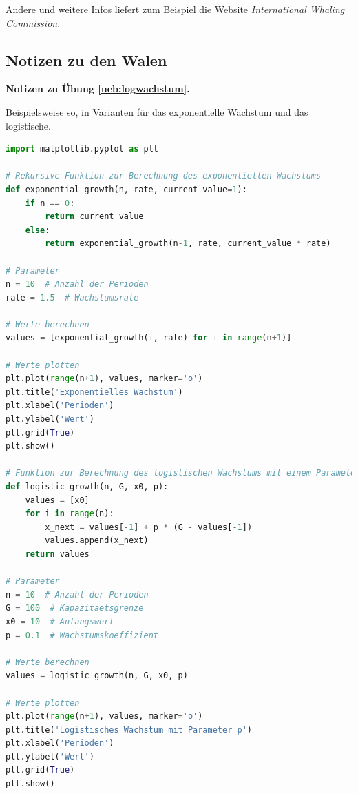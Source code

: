 \documentclass[%
11pt,%
twoside,%
titlepage,%
german,%
headsepline%
]{scrartcl}
\newcommand{\concatueb}[1]{ueb:#1}%
\newcommand{\concatlsg}[1]{lsg:#1}%
\newenvironment{lsg}[1]{%
    \par\noindent\textbf{Notizen zu Übung \ref{\concatueb{#1}}.}%
    \label{\concatlsg{#1}}
}{%
    \par%
}
\begin{document}
Andere und weitere Infos liefert zum Beispiel die Website \emph{International Whaling Commission}.

\clearpage

\subsection{Notizen zu den Walen}

\begin{lsg}{logwachstum}
Beispielsweise so, in Varianten für das exponentielle Wachstum und das logistische.

\begin{lstlisting}[language=Python]
import matplotlib.pyplot as plt

# Rekursive Funktion zur Berechnung des exponentiellen Wachstums
def exponential_growth(n, rate, current_value=1):
    if n == 0:
        return current_value
    else:
        return exponential_growth(n-1, rate, current_value * rate)

# Parameter
n = 10  # Anzahl der Perioden
rate = 1.5  # Wachstumsrate

# Werte berechnen
values = [exponential_growth(i, rate) for i in range(n+1)]

# Werte plotten
plt.plot(range(n+1), values, marker='o')
plt.title('Exponentielles Wachstum')
plt.xlabel('Perioden')
plt.ylabel('Wert')
plt.grid(True)
plt.show()

# Funktion zur Berechnung des logistischen Wachstums mit einem Parameter p
def logistic_growth(n, G, x0, p):
    values = [x0]
    for i in range(n):
        x_next = values[-1] + p * (G - values[-1])
        values.append(x_next)
    return values

# Parameter
n = 10  # Anzahl der Perioden
G = 100  # Kapazitaetsgrenze
x0 = 10  # Anfangswert
p = 0.1  # Wachstumskoeffizient

# Werte berechnen
values = logistic_growth(n, G, x0, p)

# Werte plotten
plt.plot(range(n+1), values, marker='o')
plt.title('Logistisches Wachstum mit Parameter p')
plt.xlabel('Perioden')
plt.ylabel('Wert')
plt.grid(True)
plt.show()
\end{lstlisting}
\end{lsg}
\end{document}
